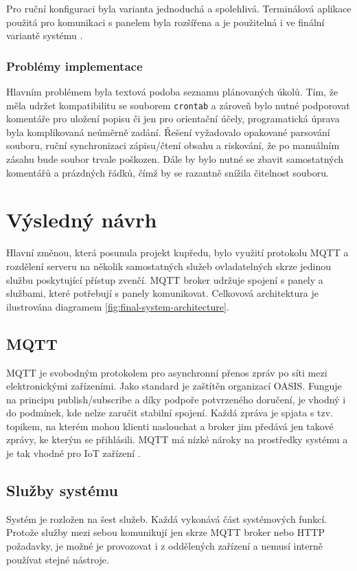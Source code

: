 Pro ruční konfiguraci byla varianta jednoduchá a spolehlivá. Terminálová aplikace použitá pro komunikaci s panelem byla rozšířena a je použitelná i ve finální variantě systému \cite{VsbeinkVsbeinkmqttgwcli}.

\subsubsection{Problémy implementace}
Hlavním problémem byla textová podoba seznamu plánovaných úkolů. Tím, že měla udržet kompatibilitu se souborem \lstinline|crontab| a zároveň bylo nutné podporovat komentáře pro uložení popisu či jen pro orientační účely, programatická úprava byla komplikovaná neúměrně zadání. Řešení vyžadovalo opakované parsování souboru, ruční synchronizaci zápisu/čtení obsahu a riskování, že po manuálním zásahu bude soubor trvale poškozen. Dále by bylo nutné se zbavit samostatných komentářů a prázdných řádků, čímž by se razantně snížila čitelnost souboru.

\section{Výsledný návrh}
Hlavní změnou, která posunula projekt kupředu, bylo využití protokolu MQTT a rozdělení serveru na několik samostatných služeb ovladatelných skrze jedinou službu poskytující přístup zvenčí. MQTT broker udržuje spojení s panely a službami, které potřebují s panely komunikovat. Celkovová architektura je ilustrována diagramem \ref{fig:final-system-architecture}.

\subsection{MQTT}
MQTT je svobodným protokolem pro asynchronní přenos zpráv po síti mezi elektronickými zařízeními. Jako standard je zaštítěn organizací OASIS. Funguje na principu publish/subscribe a díky podpoře potvrzeného doručení, je vhodný i do podmínek, kde nelze zaručit stabilní spojení. Každá zpráva je spjata s tzv. topikem, na kterém mohou klienti naslouchat a broker jim předává jen takové zprávy, ke kterým se přihlásili. MQTT má nízké nároky na prostředky systému a je tak vhodné pro IoT zařízení \cite{MQTTStandardIoT}.

\subsection{Služby systému}
Systém je rozložen na šest služeb. Každá vykonává část systémových funkcí. Protože služby mezi sebou komunikují jen skrze MQTT broker nebo HTTP požadavky, je možné je provozovat i z oddělených zařízení a nemusí interně používat stejné nástroje.

